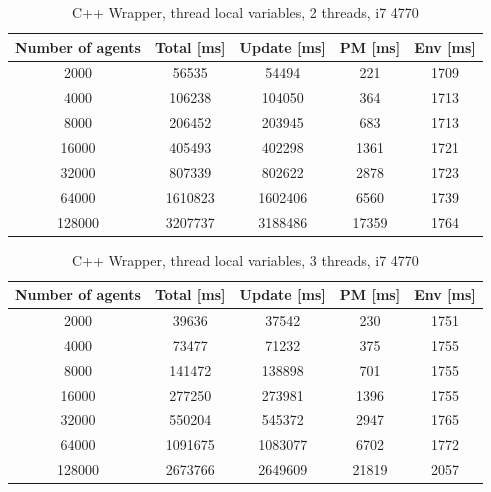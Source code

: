 \documentclass[12pt, a4paper]{report}
\begin{document}
\begin{appendices}
\begin{table}[H]
  \begin{center}
    \begin{tabular}{|c||c||c|c|c|}
    \hline
    Number of agents & Total [ms] & Update [ms] & PM [ms] & Env [ms] \\ \hline
    2000             & 56535      & 54494       & 221     & 1709     \\
    4000             & 106238     & 104050      & 364     & 1713     \\
    8000             & 206452     & 203945      & 683     & 1713     \\
    16000            & 405493     & 402298      & 1361    & 1721     \\
    32000            & 807339     & 802622      & 2878    & 1723     \\
    64000            & 1610823    & 1602406     & 6560    & 1739     \\
    128000           & 3207737    & 3188486     & 17359   & 1764     \\ \hline
    \end{tabular}
    \caption {C++ Wrapper, thread local variables, 2 threads, i7 4770}
    \label{table:append-c++-wrap-2-thread-line}
  \end{center}
\end{table}

\begin{table}[H]
  \begin{center}
    \begin{tabular}{|c||c||c|c|c|}
    \hline
    Number of agents & Total [ms] & Update [ms] & PM [ms] & Env [ms] \\ \hline
    2000             & 39636      & 37542       & 230     & 1751     \\
    4000             & 73477      & 71232       & 375     & 1755     \\
    8000             & 141472     & 138898      & 701     & 1755     \\
    16000            & 277250     & 273981      & 1396    & 1755     \\
    32000            & 550204     & 545372      & 2947    & 1765     \\
    64000            & 1091675    & 1083077     & 6702    & 1772     \\
    128000           & 2673766    & 2649609     & 21819   & 2057     \\ \hline
    \end{tabular}
    \caption {C++ Wrapper, thread local variables, 3 threads, i7 4770}
    \label{table:append-c++-wrap-3-thread-line}
  \end{center}
\end{table}



\end{appendices}
\end{document}
